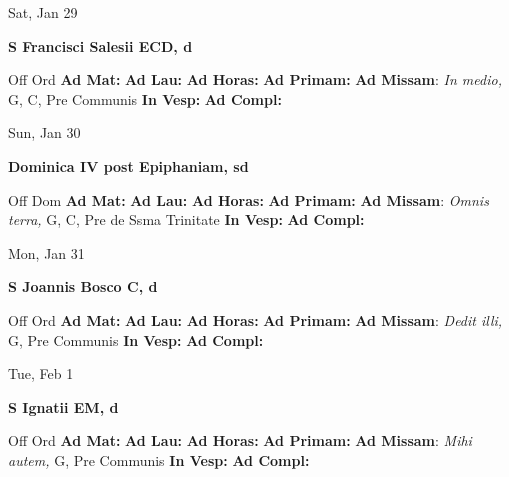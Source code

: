 \documentclass[10pt]{article}
\begin{document}
\begin{minipage}{3.5in}
\vspace{2em}\begin{center}
Sat, Jan 29
\end{center}\textbf{ \large S Francisci Salesii ECD, \textnormal{\normalsize d}}
\begin{justify}
Off Ord
\textbf{Ad Mat: }
\textbf{Ad Lau: }
\textbf{Ad Horas: }
\textbf{Ad Primam: }
\textbf{Ad Missam}: \textit{In medio,} G, C, Pre Communis
\textbf{In Vesp: }
\textbf{Ad Compl: }\end{justify}
\end{minipage}



\begin{minipage}{3.5in}
\vspace{2em}\begin{center}
Sun, Jan 30
\end{center}\textbf{ \large Dominica IV post Epiphaniam, \textnormal{\normalsize sd}}
\begin{justify}
Off Dom
\textbf{Ad Mat: }
\textbf{Ad Lau: }
\textbf{Ad Horas: }
\textbf{Ad Primam: }
\textbf{Ad Missam}: \textit{Omnis terra,} G, C, Pre de Ssma Trinitate
\textbf{In Vesp: }
\textbf{Ad Compl: }\end{justify}
\end{minipage}



\begin{minipage}{3.5in}
\vspace{2em}\begin{center}
Mon, Jan 31
\end{center}\textbf{ \large S Joannis Bosco C, \textnormal{\normalsize d}}
\begin{justify}
Off Ord
\textbf{Ad Mat: }
\textbf{Ad Lau: }
\textbf{Ad Horas: }
\textbf{Ad Primam: }
\textbf{Ad Missam}: \textit{Dedit illi,} G, Pre Communis
\textbf{In Vesp: }
\textbf{Ad Compl: }\end{justify}
\end{minipage}



\begin{minipage}{3.5in}
\vspace{2em}\begin{center}
Tue, Feb 1
\end{center}\textbf{ \large S Ignatii EM, \textnormal{\normalsize d}}
\begin{justify}
Off Ord
\textbf{Ad Mat: }
\textbf{Ad Lau: }
\textbf{Ad Horas: }
\textbf{Ad Primam: }
\textbf{Ad Missam}: \textit{Mihi autem,} G, Pre Communis
\textbf{In Vesp: }
\textbf{Ad Compl: }\end{justify}
\end{minipage}
\end{document}
